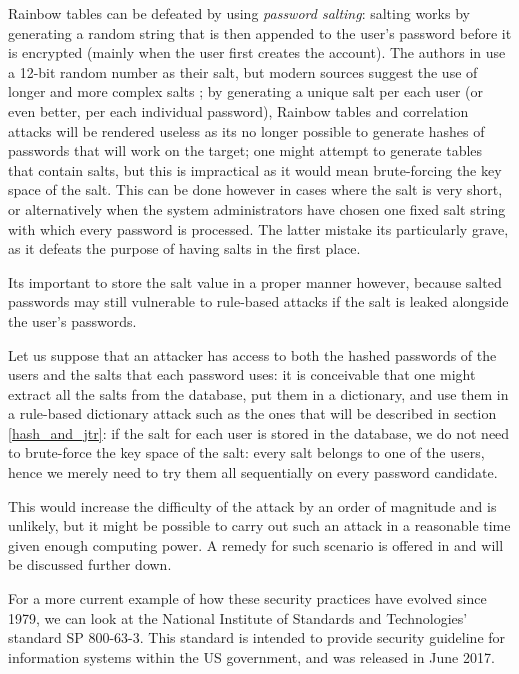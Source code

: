 Rainbow tables can be defeated by using \emph{password salting}: salting works by generating a random string that is then appended to the user's password before it is encrypted (mainly when the user first creates the account). The authors in \cite{Thompson1979} use a 12-bit random number as their salt, but modern sources suggest the use of longer and more complex salts \cite{NIST_2017}; by generating a unique salt per each user (or even better, per each individual password), Rainbow tables and correlation attacks will be rendered useless as its no longer possible to generate hashes of passwords that will work on the target; one might attempt to generate tables that contain salts, but this is impractical as it would mean brute-forcing the key space of the salt.
This can be done however in cases where the salt is very short, or alternatively when the system administrators have chosen one fixed salt string with which every password is processed.
The latter mistake its particularly grave, as it defeats the purpose of having salts in the first place.\neline
   
Its important to store the salt value in a proper manner however, because salted passwords may still vulnerable to rule-based attacks if the salt is leaked alongside the user's passwords.

Let us suppose that an attacker has access to both the hashed passwords of the users and the salts that each password uses: it is conceivable that one might extract all the salts from the database, put them in a dictionary, and use them in a rule-based dictionary attack such as the ones that will be described in section \ref{hash_and_jtr}: if the salt for each user is stored in the database, we do not need to brute-force the key space of the salt: every salt belongs to one of the users, hence we merely need to try them all sequentially on every password candidate. 

This would increase the difficulty of the attack by an order of magnitude and is unlikely, but it might be possible to carry out such an attack in a reasonable time given enough computing power. A remedy for such scenario is offered in \cite{NIST_2017} and will be discussed further down.\newline %

For a more current example of how these security practices have evolved since 1979, we can look at the National Institute of Standards and Technologies' standard SP 800-63-3.
This standard is intended to provide security guideline for information systems within the US government, and was released in June 2017.

